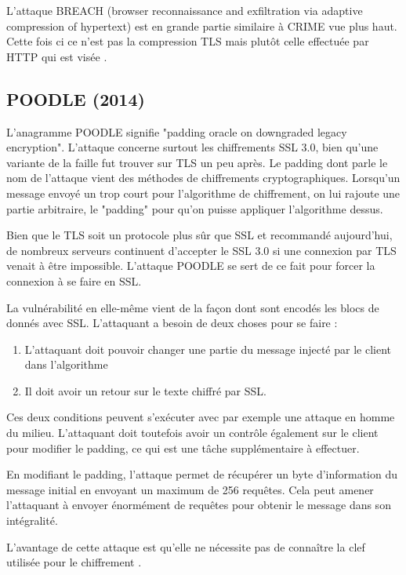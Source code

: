 L'attaque BREACH (browser reconnaissance and exfiltration via adaptive compression of hypertext) est en grande partie similaire à CRIME vue plus haut. Cette fois ci ce n'est pas la compression TLS mais plutôt celle effectuée par HTTP qui est visée \cite{breach}.

\subsection{POODLE (2014)}

L'anagramme POODLE signifie "padding oracle on downgraded legacy encryption". L'attaque concerne surtout les chiffrements SSL 3.0, bien qu'une variante de la faille fut trouver sur TLS un peu après.
Le padding dont parle le nom de l'attaque vient des méthodes de chiffrements cryptographiques. Lorsqu'un message envoyé un trop court pour l'algorithme de chiffrement, on lui rajoute une partie arbitraire, le "padding" pour qu'on puisse appliquer l'algorithme dessus.

Bien que le TLS soit un protocole plus sûr que SSL et recommandé aujourd'hui, de nombreux serveurs continuent d'accepter le SSL 3.0 si une connexion par TLS venait à être impossible. L'attaque POODLE se sert de ce fait pour forcer la connexion à se faire en SSL.

La vulnérabilité en elle-même vient de la façon dont sont encodés les blocs de donnés avec SSL. L'attaquant a besoin de deux choses pour se faire :

\begin{enumerate}
    \item L'attaquant doit pouvoir changer une partie du message injecté par le client dans l'algorithme
    \item Il doit avoir un retour sur le texte chiffré par SSL.
\end{enumerate}

Ces deux conditions peuvent s'exécuter avec par exemple une attaque en homme du milieu. L'attaquant doit toutefois avoir un contrôle également sur le client pour modifier le padding, ce qui est une tâche supplémentaire à effectuer.

En modifiant le padding, l'attaque permet de récupérer un byte d'information du message initial en envoyant un maximum de 256 requêtes. Cela peut amener l'attaquant à envoyer énormément de requêtes pour obtenir le message dans son intégralité.

L'avantage de cette attaque est qu'elle ne nécessite pas de connaître la clef utilisée pour le chiffrement \cite{poodle}.

